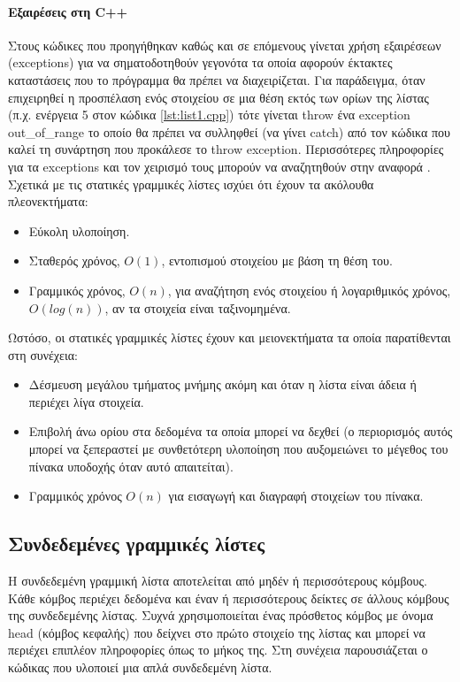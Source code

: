 

\paragraph{Εξαιρέσεις στη C++} Στους κώδικες που προηγήθηκαν καθώς και σε επόμενους γίνεται χρήση εξαιρέσεων (exceptions) για να σηματοδοτηθούν γεγονότα τα οποία αφορούν έκτακτες καταστάσεις που το πρόγραμμα θα πρέπει να διαχειρίζεται. Για παράδειγμα, όταν επιχειρηθεί η προσπέλαση ενός στοιχείου σε μια θέση εκτός των ορίων της λίστας (π.χ. ενέργεια 5 στον κώδικα \ref{lst:list1.cpp}) τότε γίνεται throw ένα exception out\_of\_range το οποίο θα πρέπει να συλληφθεί (να γίνει catch) από τον κώδικα που καλεί τη συνάρτηση που προκάλεσε το throw exception. Περισσότερες πληροφορίες για τα exceptions και τον χειρισμό τους μπορούν να αναζητηθούν στην αναφορά \cite{cppexceptions}.\\

\noindent Σχετικά με τις στατικές γραμμικές λίστες ισχύει ότι έχουν τα ακόλουθα πλεονεκτήματα:
\begin{itemize}[nolistsep]
\item Εύκολη υλοποίηση. 
\item Σταθερός χρόνος, $O(1)$, εντοπισμού στοιχείου με βάση τη θέση του.
\item Γραμμικός χρόνος, $O(n)$, για αναζήτηση ενός στοιχείου ή λογαριθμικός χρόνος, $O(log(n))$, αν τα στοιχεία είναι ταξινομημένα.
\end{itemize}

\noindent Ωστόσο, οι στατικές γραμμικές λίστες έχουν και μειονεκτήματα τα οποία παρατίθενται στη συνέχεια:
\begin{itemize}[nolistsep]
\item Δέσμευση μεγάλου τμήματος μνήμης ακόμη και όταν η λίστα είναι άδεια ή περιέχει λίγα στοιχεία. 
\item Επιβολή άνω ορίου στα δεδομένα τα οποία μπορεί να δεχθεί (ο περιορισμός αυτός μπορεί να ξεπεραστεί με συνθετότερη υλοποίηση που αυξομειώνει το μέγεθος του πίνακα υποδοχής όταν αυτό απαιτείται).
\item Γραμμικός χρόνος $O(n)$ για εισαγωγή και διαγραφή στοιχείων του πίνακα.
\end{itemize}


\subsection{Συνδεδεμένες γραμμικές λίστες}
Η συνδεδεμένη γραμμική λίστα αποτελείται από μηδέν ή περισσότερους κόμβους. Κάθε κόμβος περιέχει δεδομένα και έναν ή περισσότερους δείκτες σε άλλους κόμβους της συνδεδεμένης λίστας. Συχνά χρησιμοποιείται ένας πρόσθετος κόμβος με όνομα head (κόμβος κεφαλής) που δείχνει στο πρώτο στοιχείο της λίστας και μπορεί να περιέχει επιπλέον πληροφορίες όπως το μήκος της. Στη συνέχεια παρουσιάζεται ο κώδικας που υλοποιεί μια απλά συνδεδεμένη λίστα.

